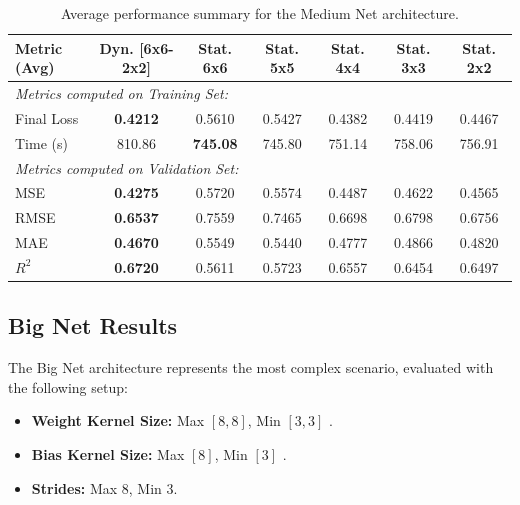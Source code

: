 \begin{table}[h]
\centering
\scriptsize
\begin{tabular}{|l|c|c|c|c|c|c|}
\hline
\textbf{Metric (Avg)} & \textbf{Dyn. [6x6-2x2]} & \textbf{Stat. 6x6} & \textbf{Stat. 5x5} & \textbf{Stat. 4x4} & \textbf{Stat. 3x3} & \textbf{Stat. 2x2} \\ \hline
\multicolumn{7}{|l|}{\textit{Metrics computed on Training Set:}} \\ \hline
Final Loss            & \textbf{0.4212}                  & 0.5610             & 0.5427             & 0.4382             & 0.4419             & 0.4467             \\ \hline
Time (s)              & 810.86                  & \textbf{745.08}             & 745.80             & 751.14             & 758.06             & 756.91             \\ \hline
\multicolumn{7}{|l|}{\textit{Metrics computed on Validation Set:}} \\ \hline
MSE                   & \textbf{0.4275}                  & 0.5720             & 0.5574             & 0.4487             & 0.4622             & 0.4565             \\ \hline
RMSE                  & \textbf{0.6537}                  & 0.7559             & 0.7465             & 0.6698             & 0.6798             & 0.6756             \\ \hline
MAE                   & \textbf{0.4670}                  & 0.5549             & 0.5440             & 0.4777             & 0.4866             & 0.4820             \\ \hline
$R^2$                 & \textbf{0.6720}                  & 0.5611             & 0.5723             & 0.6557             & 0.6454             & 0.6497             \\ \hline
\end{tabular}
\caption{Average performance summary for the Medium Net architecture.}
\label{tab:medium_net_results}
\end{table}

\newpage

\subsection{Big Net Results}

The Big Net architecture represents the most complex scenario, evaluated with the following setup:
\begin{itemize}
    \item \textbf{Weight Kernel Size:} Max $[8,8]$, Min $[3,3]$ .
    \item \textbf{Bias Kernel Size:} Max $[8]$, Min $[3]$ .
    \item \textbf{Strides:} Max 8, Min 3.
    
\end{itemize}

